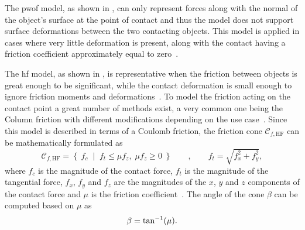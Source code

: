The \gls{pwof} model, as shown in , can only represent forces along with the normal of the object's surface at the point of contact and thus the model does not support surface deformations between the two contacting objects. This model is applied in cases where very little deformation is present, along with the contact having a friction coefficient approximately equal to zero~\cite[Chapter 38]{handbook-of-robotics}.\medskip

The \gls{hf} model, as shown in , is representative when the friction between objects is great enough to be significant, while the contact deformation is small enough to ignore friction moments and deformations~\cite[Chapter 38]{handbook-of-robotics}. To model the friction acting on the contact point a great number of methods exist, a very common one being the Column friction with different modifications depending on the use case~\cite{modelling-of-joint-friction-in-robotic-manipulators-with-gear-transmissions}. Since this model is described in terms of a Coulomb friction, the friction cone $\mathcal{C}_{f,\text{HF}}$ can be mathematically formulated as
%
\begin{equation} 
	\mathcal{C}_{f,\text{HF}} = \left\{ \; f_c\; \middle|\; f_{t} \le \mu f_z,\; \mu f_z \ge 0 \; \right\} \qquad , \qquad f_t = \sqrt{f_x^2 + f_y^2},
	\label{eq:hf}
\end{equation}
where $f_c$ is the magnitude of the contact force, $f_t$ is the magnitude of the tangential force, $f_x$, $f_y$ and $f_z$ are the magnitudes of the $x$, $y$ and $z$ components of the contact force and $\mu$ is the friction coefficient~\cite[Chapter 37]{handbook-of-robotics}. The angle of the cone $\beta$ can be computed based on $\mu$ as
%
\begin{equation} 
	\beta = \tan^{-1} (\mu).
	\label{eq:hf-cone-angle}
\end{equation}

